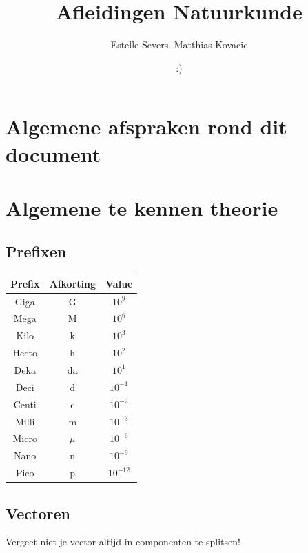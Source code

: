 \documentclass[12pt,a4paper]{article}
\author{Estelle Severs, Matthias Kovacic}
\title{Afleidingen Natuurkunde}
\date{:)}
\begin{document}
    \maketitle
    \tableofcontents
    \newpage


    \section{Algemene afspraken rond dit document}


    \section{Algemene te kennen theorie}

    \subsection{Prefixen}
    \begin{center}
        \begin{tabular}{ | c | c | c | }
            \hline
            Prefix & Afkorting & Value      \\
            \hline
            Giga        & G         & $10^{9}$   \\
            Mega        & M         & $10^{6}$   \\
            Kilo        & k         & $10^{3}$   \\
            Hecto       & h         & $10^{2}$   \\
            Deka        & da        & $10^{1}$   \\
            Deci        & d         & $10^{-1}$  \\
            Centi       & c         & $10^{-2}$  \\
            Milli       & m         & $10^{-3}$  \\
            Micro       & $\mu$     & $10^{-6}$  \\
            Nano        & n         & $10^{-9}$  \\
            Pico        & p         & $10^{-12}$ \\
            \hline
        \end{tabular}
    \end{center}

    \subsection{Vectoren}
    Vergeet niet je vector altijd in componenten te splitsen!
\end{document}
